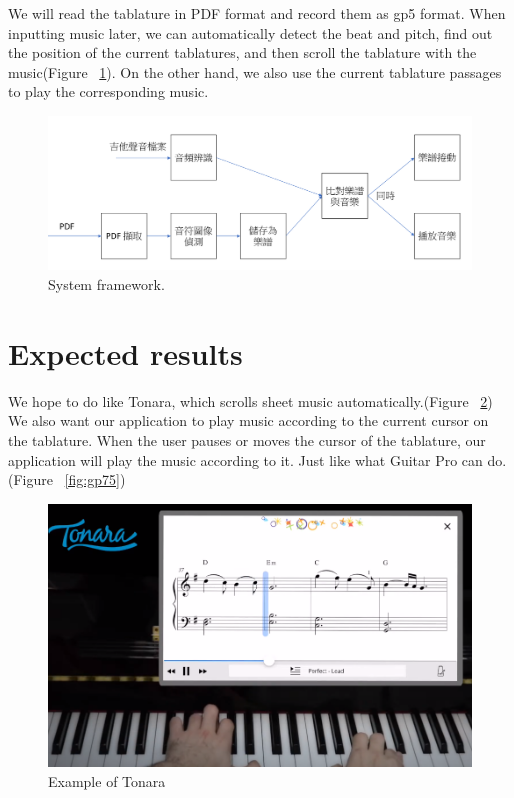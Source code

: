 \documentclass[10pt,twocolumn,letterpaper]{article}
\begin{document}
\begin{CJK}{UTF8}{bsmi}
We will read the tablature in PDF format and record them as gp5 format. When inputting music later, we can automatically detect the beat and pitch, find out the position of the current tablatures, and then scroll the tablature with the music(Figure ~\ref{fig:step1}). On the other hand, we also use the current tablature passages to play the corresponding music.

\begin{figure}
\begin{center}
\includegraphics[width=.9\linewidth]{step1.png}
\end{center}
   \caption{System framework.}
\label{fig:step1}
\end{figure}

\section{Expected results}

We hope to do like Tonara\cite{Tonara}, which scrolls sheet music automatically.(Figure ~\ref{fig:tonara}) We also want our application to play music according to the current cursor on the tablature. When the user pauses or moves the cursor of the tablature, our application will play the music according to it. Just like what Guitar Pro\cite{GuitarPro} can do.(Figure ~\ref{fig:gp75})

\begin{figure}[t]
\begin{center}
   \includegraphics[width=0.8\linewidth]{tonara.png}
\end{center}
   \caption{Example of Tonara\cite{Tonara2}}
\label{fig:long}
\label{fig:tonara}
\end{figure}


\end{CJK}
\end{document}
